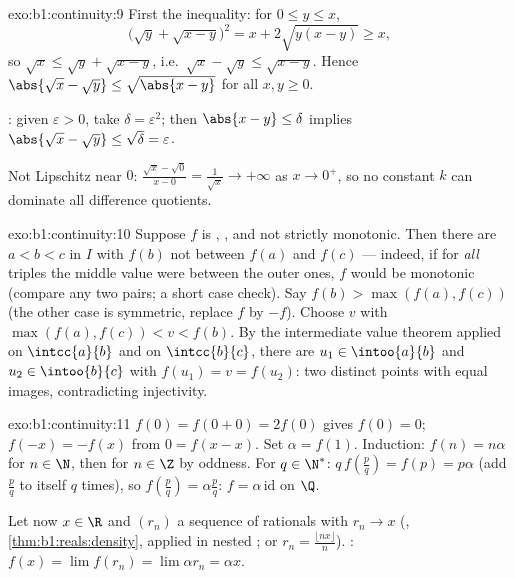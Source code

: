 \begin{solution}{exo:b1:continuity:9}
First the inequality: for $0 \leq y \leq x$,
\[
\bigl(\sqrt y + \sqrt{x - y}\bigr)^2 = x + 2\sqrt{y(x-y)} \geq x,
\]
so $\sqrt x \leq \sqrt y + \sqrt{x - y}$, i.e.\ $\sqrt x - \sqrt y
\leq \sqrt{x - y}$. Hence $\abs{\sqrt x - \sqrt y} \leq
\sqrt{\abs{x - y}}$ for all $x, y \geq 0$.

: given $\varepsilon > 0$, take $\delta =
\varepsilon^2$; then $\abs{x - y} \leq \delta$ implies $\abs{\sqrt x
- \sqrt y} \leq \sqrt\delta = \varepsilon$.

Not Lipschitz near $0$: $\frac{\sqrt x - \sqrt 0}{x - 0} =
\frac{1}{\sqrt x} \to +\infty$ as $x \to 0^+$, so no constant $k$
can dominate all difference quotients.
\end{solution}

\begin{solution}{exo:b1:continuity:10}
Suppose $f$ is , , and not strictly monotonic.
Then there are $a < b < c$ in $I$ with $f(b)$ not between $f(a)$ and
$f(c)$ --- indeed, if for \emph{all} triples the middle value were
between the outer ones, $f$ would be monotonic (compare any two
pairs; a short case check). Say $f(b) > \max(f(a), f(c))$ (the other
case is symmetric, replace $f$ by $-f$). Choose $v$ with $\max(f(a),
f(c)) < v < f(b)$. By the intermediate value theorem applied on
$\intcc{a}{b}$ and on $\intcc{b}{c}$, there are $u_1 \in
\intoo{a}{b}$ and $u_2 \in \intoo{b}{c}$ with $f(u_1) = v = f(u_2)$:
two distinct points with equal images, contradicting injectivity.
\end{solution}

\begin{solution}{exo:b1:continuity:11}
$f(0) = f(0+0) = 2f(0)$ gives $f(0) = 0$; $f(-x) = -f(x)$ from $0 =
f(x - x)$. Set $\alpha = f(1)$. Induction: $f(n) = n\alpha$ for $n
\in \N$, then for $n \in \Z$ by oddness. For $q \in \N^*$:
$q\,f(\frac pq) = f(p) = p\alpha$ (add $\frac pq$ to itself $q$
times), so $f(\frac pq) = \alpha\frac pq$: $f = \alpha\,
\mathrm{id}$ on $\Q$.

Let now $x \in \R$ and $(r_n)$ a sequence of rationals with $r_n \to
x$ (, \cref{thm:b1:reals:density}, applied in nested
; or $r_n = \frac{\lfloor nx\rfloor}{n}$). :
$f(x) = \lim f(r_n) = \lim \alpha r_n = \alpha x$.
\end{solution}

